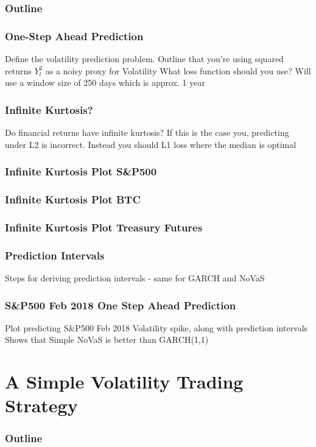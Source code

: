 \documentclass{beamer}
\begin{document}
\begin{frame}
\frametitle{Outline}
\tableofcontents[currentsection]
\end{frame}

\begin{frame}
\frametitle{One-Step Ahead Prediction}
Define the volatility prediction problem.
Outline that you're using squared returns $Y_{t}^2$ as a noisy proxy for Volatility
What loss function should you use?
Will use a window size of 250 days which is approx. 1 year
\end{frame}

\begin{frame}
\frametitle{Infinite Kurtosis?}
Do financial returns have infinite kurtosis?
If this is the case you, predicting under L2 is incorrect. Instead you should L1 loss where the median is optimal
\end{frame}

\begin{frame}
\frametitle{Infinite Kurtosis Plot S&P500}

\end{frame}

\begin{frame}
\frametitle{Infinite Kurtosis Plot BTC}

\end{frame}

\begin{frame}
\frametitle{Infinite Kurtosis Plot Treasury Futures}

\end{frame}

\begin{frame}
\frametitle{Prediction Intervals}
Steps for deriving prediction intervals - same for GARCH and NoVaS
\end{frame}

\begin{frame}
\frametitle{S&P500 Feb 2018 One Step Ahead Prediction}
Plot predicting S&P500 Feb 2018 Volatility spike, along with prediction intervals
Shows that Simple NoVaS is better than GARCH(1,1)
\end{frame}

\section{A Simple Volatility Trading Strategy}

\begin{frame}
\frametitle{Outline}
\tableofcontents[currentsection]
\end{frame}
\end{document}
